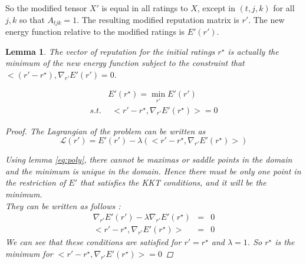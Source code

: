 \documentclass[12pt,a4paper]{article}
\newtheorem{lemma}{Lemma}
\begin{document}
So the modified tensor $X'$ is equal in all ratings to $X$, except in $(t,j,k)$ for all $j,k$ so that $A_{tjk}=1$. The resulting modified reputation matrix is $r'$. The new energy function relative to the modified ratings is $E'(r')$.
\begin{lemma}
The vector of reputation for the initial ratings $r^{\star}$ is actually the minimum of the new energy function subject to the constraint that $<(r'-r^{\star}),\nabla_{r'} E'(r') = 0$.

\begin{align*} 
 & E'(r^{\star}) = \min_{r'} E'(r')\\
s.t.  & \:\: <r'-r^{\star},\nabla_{r'} E'(r^{\star})>=0
\end{align*}

\begin{proof}
The Lagrangian of the problem can be written as
$$\mathcal{L}(r') = E'(r') - \lambda (<r' - r^{\star},\nabla_{r'} E'(r^{\star})>)$$

Using lemma \ref{eq:poly}, there cannot be maximas or saddle points in the domain and the minimum is unique in the domain. Hence there must be only one point in the restriction of $E'$ that satisfies the KKT conditions, and it will be the minimum.\\
They can be written as follows :
\begin{align*}
\nabla_{r'} E'(r') - \lambda \nabla_{r'} E'(r^{\star}) & = & 0\\
<r'-r^{\star},\nabla_{r'} E'(r^{\star})> & = & 0
\end{align*}
We can see that these conditions are satisfied for $r' = r^{\star}$ and $\lambda = 1$. So $r^{\star}$ is the minimum for $<r'-r^{\star},\nabla_{r'} E'(r^{\star})>=0$
\end{proof}
\end{lemma}
\end{document}
